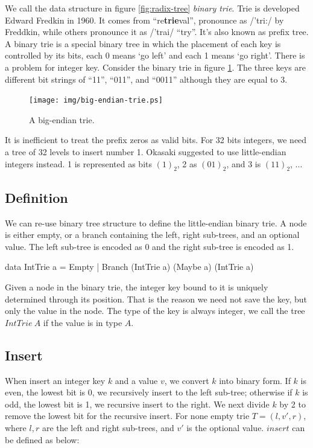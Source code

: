 \documentclass[b5paper]{article}
\begin{document}
We call the data structure in figure \ref{fig:radix-tree} \emph{binary trie}. Trie is developed Edward Fredkin in 1960. It comes from ``re\textbf{trie}val'', pronounce as /'tri:/ by Freddkin, while others pronounce it as /'trai/ ``try''\cite{wiki-trie}. It's also known as prefix tree. A binary trie is a special binary tree in which the placement of each key is controlled by its bits, each 0 means `go left' and each 1 means `go right'\cite{okasaki-int-map}. There is a problem for integer key. Consider the binary trie in figure \ref{fig:big-endian-trie}. The three keys are different bit strings of ``11'', ``011'', and ``0011'' although they are equal to 3.

\begin{figure}[htbp]
  \centering
  \texttt{[image: img/big-endian-trie.ps]}
  \caption{A big-endian trie.}
  \label{fig:big-endian-trie}
\end{figure}

It is inefficient to treat the prefix zeros as valid bits. For 32 bits integers, we need a tree of 32 levels to insert number 1. Okasaki suggested to use little-endian integers instead\cite{okasaki-int-map}. 1 is represented as bits $(1)_2$, 2 as $(01)_2$, and 3 is $(11)_2$, ...

\subsection{Definition}
We can re-use binary tree structure to define the little-endian binary trie. A node is either empty, or a branch containing the left, right sub-trees, and an optional value. The left sub-tree is encoded as 0 and the right sub-tree is encoded as 1.

\lstset{frame = single}
\begin{Haskell}
data IntTrie a = Empty
               | Branch (IntTrie a) (Maybe a) (IntTrie a)
\end{Haskell}

Given a node in the binary trie, the integer key bound to it is uniquely determined through its position. That is the reason we need not save the key, but only the value in the node. The type of the key is always integer, we call the tree $IntTrie\ A$ if the value is in type $A$.

\subsection{Insert}

When insert an integer key $k$ and a value $v$, we convert $k$ into binary form. If $k$ is even, the lowest bit is 0, we recursively insert to the left sub-tree; otherwise if $k$ is odd, the lowest bit is 1, we recursive insert to the right. We next divide $k$ by 2 to remove the lowest bit for the recursive insert. For none empty trie $T = (l, v', r)$, where $l, r$ are the left and right sub-trees, and $v'$ is the optional value. $insert$ can be defined as below:
\end{document}
